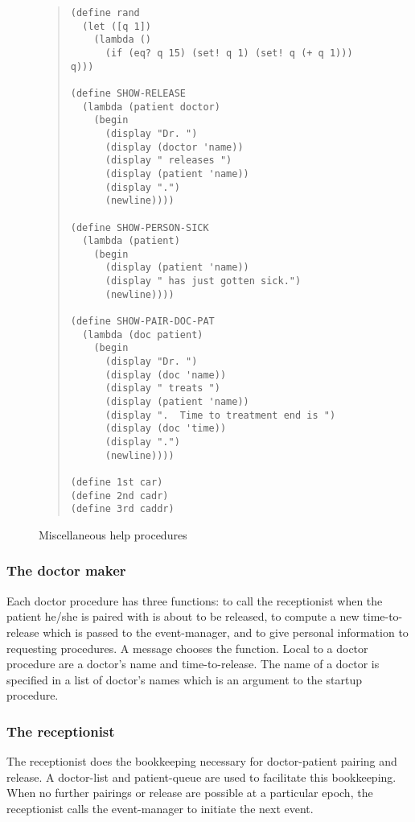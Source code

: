\begin{figure}
\begin{frameit}
\begin{quote}
\begin{verbatim}
(define rand
  (let ([q 1])
    (lambda ()
      (if (eq? q 15) (set! q 1) (set! q (+ q 1))) q)))

(define SHOW-RELEASE
  (lambda (patient doctor)
    (begin
      (display "Dr. ")
      (display (doctor 'name))
      (display " releases ")
      (display (patient 'name))
      (display ".")
      (newline))))

(define SHOW-PERSON-SICK
  (lambda (patient)
    (begin
      (display (patient 'name))
      (display " has just gotten sick.")
      (newline))))

(define SHOW-PAIR-DOC-PAT
  (lambda (doc patient)
    (begin
      (display "Dr. ")
      (display (doc 'name))
      (display " treats ")
      (display (patient 'name))
      (display ".  Time to treatment end is ")
      (display (doc 'time))
      (display ".")
      (newline))))

(define 1st car)
(define 2nd cadr)
(define 3rd caddr)
\end{verbatim}
\end{quote}
\caption{Miscellaneous help procedures}
\end{frameit}
\end{figure}

\subsubsection{The doctor maker}

Each doctor procedure has three functions: to call the receptionist when
the patient he/she is paired with is about to be released, to compute a new
time-to-release which is passed to the event-manager, and to give personal
information to requesting procedures.  A message chooses the function.  Local
to a doctor procedure are a doctor's name and time-to-release.  The name of a
doctor is specified in a list of doctor's names which is an argument to the
startup procedure.

\subsubsection{The receptionist}

The receptionist does the bookkeeping necessary for doctor-patient pairing and
release.  A doctor-list and patient-queue are used to facilitate this
bookkeeping.  When no further pairings or release are possible at a
particular epoch, the receptionist calls the event-manager to initiate the
next event.

